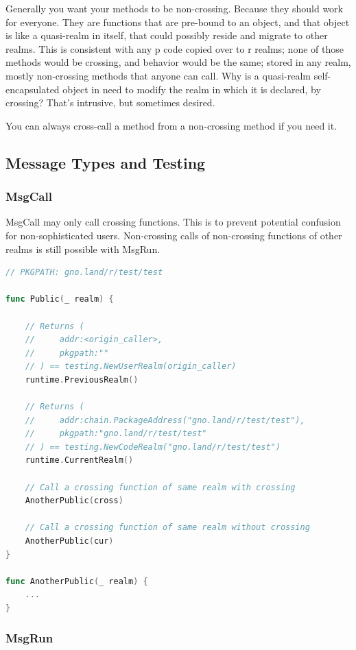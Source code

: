 \documentclass[12pt,a4paper]{article}
\begin{document}
Generally you want your methods to be non-crossing. Because they should
work for everyone. They are functions that are pre-bound to an object,
and that object is like a quasi-realm in itself, that could possibly
reside and migrate to other realms. This is consistent with any p code
copied over to r realms; none of those methods would be crossing, and
behavior would be the same; stored in any realm, mostly non-crossing
methods that anyone can call. Why is a quasi-realm self-encapsulated
object in need to modify the realm in which it is declared, by crossing?
That's intrusive, but sometimes desired.

You can always cross-call a method from a non-crossing method if you
need it.

\subsection{Message Types and Testing}\label{message-types-and-testing}

\subsubsection{MsgCall}\label{msgcall}

MsgCall may only call crossing functions. This is to prevent potential
confusion for non-sophisticated users. Non-crossing calls of
non-crossing functions of other realms is still possible with MsgRun.

\begin{lstlisting}[language=Go]
// PKGPATH: gno.land/r/test/test

func Public(_ realm) {

    // Returns (
    //     addr:<origin_caller>,
    //     pkgpath:""
    // ) == testing.NewUserRealm(origin_caller)
    runtime.PreviousRealm()

    // Returns (
    //     addr:chain.PackageAddress("gno.land/r/test/test"),
    //     pkgpath:"gno.land/r/test/test"
    // ) == testing.NewCodeRealm("gno.land/r/test/test")
    runtime.CurrentRealm()

    // Call a crossing function of same realm with crossing
    AnotherPublic(cross)

    // Call a crossing function of same realm without crossing
    AnotherPublic(cur)
}

func AnotherPublic(_ realm) {
    ...
}
\end{lstlisting}

\subsubsection{MsgRun}\label{msgrun}
\end{document}
